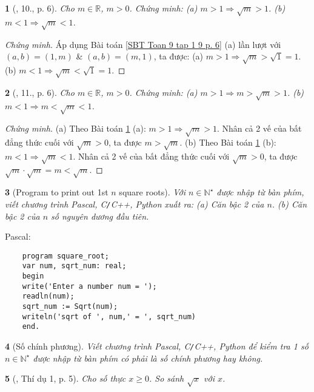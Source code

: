 \documentclass{article}
\newtheorem{baitoan}{}
\begin{document}
\begin{baitoan}[\cite{SBT_Toan_9_tap_1}, 10., p. 6]
	\label{SBT Toan 9 tap 1 10 p. 6}
	Cho $m \in\mathbb{R}$, $m > 0$. Chứng minh: (a) $m > 1\Rightarrow\sqrt{m} > 1$. (b) $m < 1\Rightarrow\sqrt{m} < 1$.
\end{baitoan}

\begin{proof}[Chứng minh]
	Áp dụng Bài toán \ref{SBT Toan 9 tap 1 9 p. 6} (a) lần lượt với $(a,b) = (1,m)$ \& $(a,b) = (m,1)$, ta được: (a) $m > 1\Rightarrow\sqrt{m} > \sqrt{1} = 1$. (b) $m < 1\Rightarrow\sqrt{m} < \sqrt{1} = 1$.
\end{proof}

\begin{baitoan}[\cite{SBT_Toan_9_tap_1}, 11., p. 6]
	Cho $m \in\mathbb{R}$, $m > 0$. Chứng minh: (a) $m > 1\Rightarrow m > \sqrt{m} > 1$. (b) $m < 1\Rightarrow m < \sqrt{m} < 1$.
\end{baitoan}

\begin{proof}[Chứng minh]
	(a) Theo Bài toán \ref{SBT Toan 9 tap 1 10 p. 6} (a): $m > 1\Rightarrow\sqrt{m} > 1$. Nhân cả 2 vế của bất đẳng thức cuối với $\sqrt{m} > 0$, ta được $m > \sqrt{m}$. (b) Theo Bài toán \ref{SBT Toan 9 tap 1 10 p. 6} (b): $m < 1\Rightarrow\sqrt{m} < 1$. Nhân cả 2 vế của bất đẳng thức cuối với $\sqrt{m} > 0$, ta được $\sqrt{m}\cdot\sqrt{m} = m < \sqrt{m}$.
\end{proof}

\begin{baitoan}[Program to print out 1st $n$ square roots]
	Với $n\in\mathbb{N}^\star$ được nhập từ bàn phím, viết chương trình {\sf Pascal, C\texttt{/}C++, Python} xuất ra: (a) Căn bậc 2 của $n$. (b) Căn bậc 2 của $n$ số nguyên dương đầu tiên. 
\end{baitoan}
Pascal:
\begin{verbatim}
	program square_root;
	var num, sqrt_num: real;		
	begin
	write('Enter a number num = ');
	readln(num);
	sqrt_num := Sqrt(num);
	writeln('sqrt of ', num,' = ', sqrt_num)
	end.
\end{verbatim}

\begin{baitoan}[Số chính phương]
	Viết chương trình {\sf Pascal, C\texttt{/}C++, Python} để kiểm tra 1 số $n\in\mathbb{N}^\star$ được nhập từ bàn phím có phải là số chính phương hay không.
\end{baitoan}

\begin{baitoan}[\cite{Tuyen_Toan_9_old}, Thí dụ 1, p. 5]
	Cho số thực $x\ge0$. So sánh $\sqrt{x}$ với $x$.
\end{baitoan}
\end{document}
